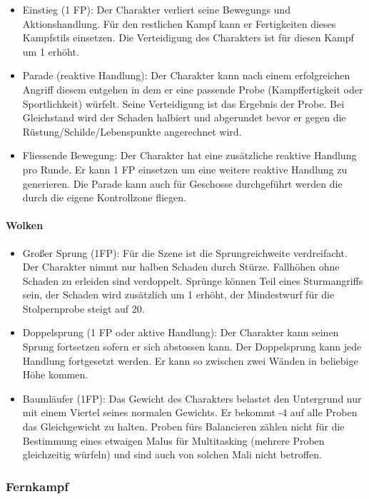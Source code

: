 \documentclass{article}
\begin{document}
\begin{itemize}
\item Einstieg (1 FP): Der Charakter verliert seine Bewegungs und Aktionshandlung. Für den restlichen Kampf kann er Fertigkeiten dieses Kampfstils einsetzen. Die Verteidigung des Charakters ist für diesen Kampf um 1 erhöht.
\item Parade (reaktive Handlung): Der Charakter kann nach einem erfolgreichen Angriff diesem entgehen in dem er eine passende Probe (Kampffertigkeit oder Sportlichkeit) würfelt. Seine Verteidigung ist das Ergebnis der Probe. Bei Gleichstand wird der Schaden halbiert und abgerundet bevor er gegen die Rüstung/Schilde/Lebenspunkte angerechnet wird.
\item Fliessende Bewegung: Der Charakter hat eine zusätzliche reaktive Handlung pro Runde. Er kann 1 FP einsetzen um eine weitere reaktive Handlung zu generieren. Die Parade kann auch für Geschosse durchgeführt werden die durch die eigene Kontrollzone fliegen.
\end{itemize}

\paragraph{Wolken}

\begin{itemize}
\item Großer Sprung (1FP): Für die Szene ist die Sprungreichweite verdreifacht. Der Charakter nimmt nur halben Schaden durch Stürze. Fallhöhen ohne Schaden zu erleiden sind verdoppelt. Sprünge können Teil eines Sturmangriffs sein, der Schaden wird zusätzlich um 1 erhöht, der Mindestwurf für die Stolpernprobe steigt auf 20.
\item Doppelsprung (1 FP oder aktive Handlung): Der Charakter kann seinen Sprung fortsetzen sofern er sich abstossen kann. Der Doppelsprung kann jede Handlung fortgesetzt werden. Er kann so zwischen zwei Wänden in beliebige Höhe kommen.
\item Baumläufer (1FP): Das Gewicht des Charakters belastet den Untergrund nur mit einem Viertel seines normalen Gewichts. Er bekommt -4 auf alle Proben das Gleichgewicht zu halten. Proben fürs Balancieren zählen nicht für die Bestimmung eines etwaigen Malus für Multitasking (mehrere Proben gleichzeitig würfeln) und sind auch von solchen Mali nicht betroffen.
\end{itemize}

\subsubsection{Fernkampf}
\end{document}
